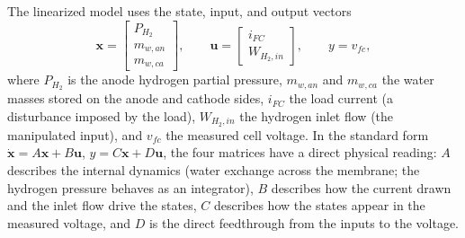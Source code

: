 \documentclass[11pt,a4paper]{article}
\begin{document}
The linearized model uses the state, input, and output vectors
\begin{equation*}
    \mathbf{x} = \begin{bmatrix} P_{H_2} \\ m_{w,an} \\ m_{w,ca} \end{bmatrix},
    \qquad
    \mathbf{u} = \begin{bmatrix} i_{FC} \\ W_{H_2,in} \end{bmatrix},
    \qquad
    y = v_{fc},
\end{equation*}
where $P_{H_2}$ is the anode hydrogen partial pressure, $m_{w,an}$ and $m_{w,ca}$
the water masses stored on the anode and cathode sides, $i_{FC}$ the load current
(a disturbance imposed by the load), $W_{H_2,in}$ the hydrogen inlet flow (the
manipulated input), and $v_{fc}$ the measured cell voltage. In the standard form
$\dot{\mathbf{x}}=A\mathbf{x}+B\mathbf{u}$, $y=C\mathbf{x}+D\mathbf{u}$, the four
matrices have a direct physical reading: $A$ describes the internal dynamics
(water exchange across the membrane; the hydrogen pressure behaves as an
integrator), $B$ describes how the current drawn and the inlet flow drive the
states, $C$ describes how the states appear in the measured voltage, and $D$ is
the direct feedthrough from the inputs to the voltage.
\end{document}

